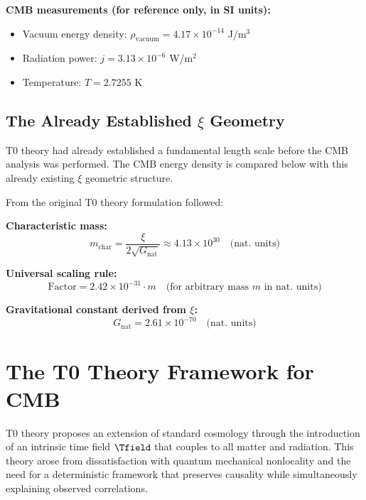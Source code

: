 	\begin{sibox}
		\textbf{CMB measurements (for reference only, in SI units):}
		\begin{itemize}
			\item Vacuum energy density: $\rho_{\text{vacuum}} = 4.17 \times 10^{-14}$ J/m$^3$
			\item Radiation power: $j = 3.13 \times 10^{-6}$ W/m$^2$
			\item Temperature: $T = 2.7255$ K
		\end{itemize}
	\end{sibox}
	
	\subsection{The Already Established $\xi$ Geometry}
	
	\begin{important}
		T0 theory had already established a fundamental length scale before the CMB analysis was performed. The CMB energy density is compared below with this already existing $\xi$ geometric structure.
	\end{important}
	
	From the original T0 theory formulation followed:
	
	\textbf{Characteristic mass:}
	\begin{equation}
		m_{\text{char}} = \frac{\xi}{2\sqrt{G_{\text{nat}}}} \approx 4.13 \times 10^{30} \quad \text{(nat. units)}
	\end{equation}
	
	\textbf{Universal scaling rule:}
	\begin{equation}
		\text{Factor} = 2.42 \times 10^{-31} \cdot m \quad \text{(for arbitrary mass } m \text{ in nat. units)}
	\end{equation}
	
	\textbf{Gravitational constant derived from $\xi$:}
	\begin{equation}
		G_{\text{nat}} = 2.61 \times 10^{-70} \quad \text{(nat. units)}
	\end{equation}
	
	\section{The T0 Theory Framework for CMB}
	\label{sec:t0_framework}
	
	T0 theory proposes an extension of standard cosmology through the introduction of an intrinsic time field $\Tfield$ that couples to all matter and radiation. This theory arose from dissatisfaction with quantum mechanical nonlocality and the need for a deterministic framework that preserves causality while simultaneously explaining observed correlations.
	
